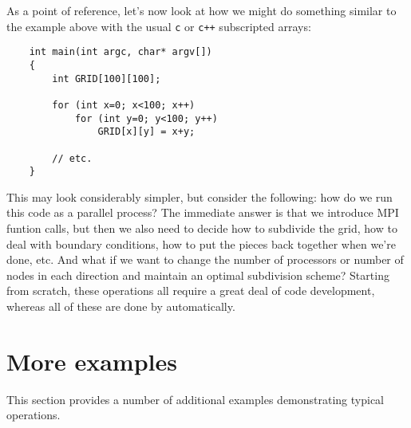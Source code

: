 As a point of reference, let's now look at how we might do something similar to the example above with the usual {\tt c} or {\tt c++} subscripted arrays:
\begin{shadebox}
\begin{verbatim}
    int main(int argc, char* argv[])
    {
        int GRID[100][100];

        for (int x=0; x<100; x++)
            for (int y=0; y<100; y++)
                GRID[x][y] = x+y;

        // etc.
    }
\end{verbatim}
\end{shadebox}
This may look considerably simpler, but consider the following: how do we run this code as a parallel process?  The immediate answer is that we introduce MPI funtion calls, but then we also need to decide how to subdivide the grid, how to deal with boundary conditions, how to put the pieces back together when we're done, etc.  And what if we want to change the number of processors or number of nodes in each direction and maintain an optimal subdivision scheme?  Starting from scratch, these operations all require a great deal of code development, whereas all of these are done by \MMSP automatically.


\section{More examples}
This section provides a number of additional examples demonstrating typical \MMSP operations.

